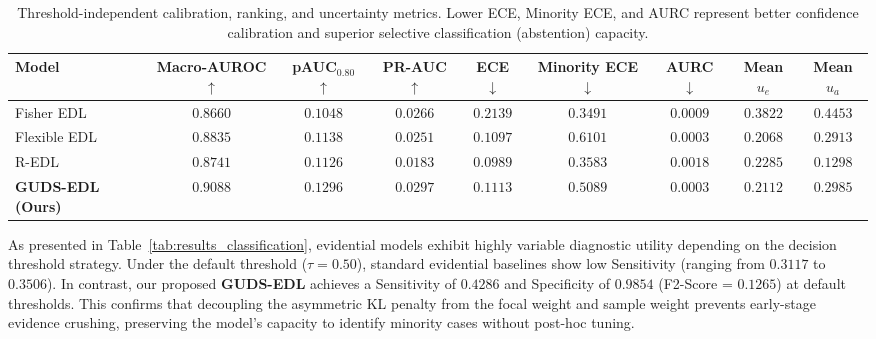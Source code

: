 \documentclass[letterpaper]{article} %
\begin{document}
\begin{table}[!t]
\vspace{0.75em}
\caption{Threshold-independent calibration, ranking, and uncertainty metrics. Lower ECE, Minority ECE, and AURC represent better confidence calibration and superior selective classification (abstention) capacity.}
\label{tab:results_uncertainty}
\renewcommand{\arraystretch}{1.12}
\setlength{\tabcolsep}{3.0pt}
\begin{adjustbox}{max width=\textwidth}
\begin{tabular}{l C C C C C C C C}
\toprule
\textbf{Model} & \textbf{Macro-AUROC} $\uparrow$ & \textbf{pAUC$_{0.80}$} $\uparrow$ & \textbf{PR-AUC} $\uparrow$ & \textbf{ECE} $\downarrow$ & \textbf{Minority ECE} $\downarrow$ & \textbf{AURC} $\downarrow$ & \textbf{Mean $u_e$} & \textbf{Mean $u_a$} \\
\midrule
Fisher EDL   & $0.8660$ & $0.1048$ & $0.0266$ & $0.2139$ & $\mathbf{0.3491}$ & $0.0009$ & $0.3822$ & $0.4453$ \\
Flexible EDL & $0.8835$ & $0.1138$ & $0.0251$ & $0.1097$ & $0.6101$ & $\mathbf{0.0003}$ & $0.2068$ & $0.2913$ \\
R-EDL        & $0.8741$ & $0.1126$ & $0.0183$ & $\mathbf{0.0989}$ & $0.3583$ & $0.0018$ & $0.2285$ & $\mathbf{0.1298}$ \\
\midrule
\textbf{GUDS-EDL (Ours)} & $\mathbf{0.9088}$ & $\mathbf{0.1296}$ & $\mathbf{0.0297}$ & $0.1113$ & $0.5089$ & $\mathbf{0.0003}$ & $0.2112$ & $0.2985$ \\
\bottomrule
\end{tabular}
\end{adjustbox}
\end{table}

As presented in Table~\ref{tab:results_classification}, evidential models exhibit highly variable diagnostic utility depending on the decision threshold strategy. Under the default threshold ($\tau = 0.50$), standard evidential baselines show low Sensitivity (ranging from $0.3117$ to $0.3506$). In contrast, our proposed \textbf{GUDS-EDL} achieves a Sensitivity of $\mathbf{0.4286}$ and Specificity of $\mathbf{0.9854}$ (F2-Score = $\mathbf{0.1265}$) at default thresholds. This confirms that decoupling the asymmetric KL penalty from the focal weight and sample weight prevents early-stage evidence crushing, preserving the model's capacity to identify minority cases without post-hoc tuning.
\end{document}
